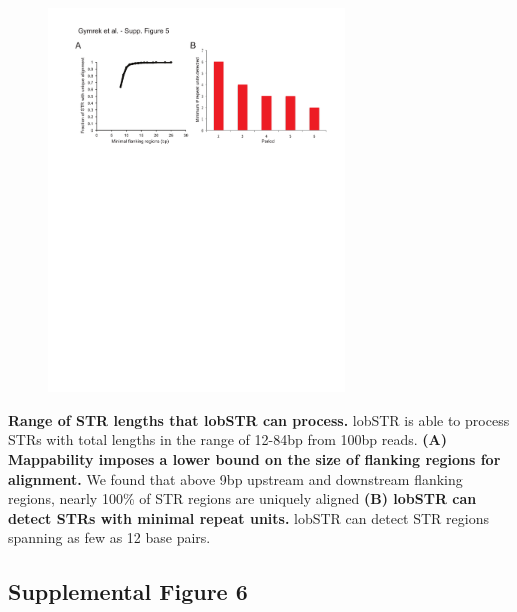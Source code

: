 {\begin{figure}[h!]
\centering
\label{fig:lobsup5}
\includegraphics[width=0.7\textwidth]{Figures/Chapter2/SuppFig5.pdf}
\end{figure}
\textbf{Range of STR lengths that lobSTR can process.} lobSTR is able to process STRs with total lengths in the range of 12-84bp from 100bp reads. \textbf{(A) Mappability imposes a lower bound on the size of flanking regions for alignment.} We found that above 9bp upstream and downstream flanking regions, nearly 100\% of STR regions are uniquely aligned \textbf{(B) lobSTR can detect STRs with minimal repeat units.} lobSTR can detect STR regions spanning as few as 12 base pairs. 

\pagebreak
\subsection{Supplemental Figure 6}

}
